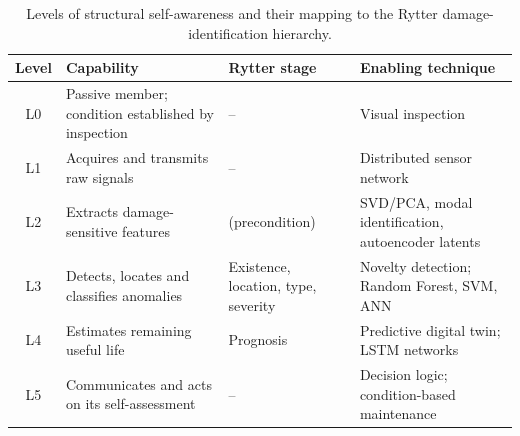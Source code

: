 \begin{table}[htbp]
\centering
\caption{Levels of structural self-awareness and their mapping to the Rytter damage-identification hierarchy.}
\label{tab:levels}
\begin{tabularx}{\linewidth}{@{}c X p{2.5cm} X@{}}
\toprule
\textbf{Level} & \textbf{Capability} & \textbf{Rytter stage} & \textbf{Enabling technique} \\
\midrule
L0 & Passive member; condition established by inspection & --             & Visual inspection \\
L1 & Acquires and transmits raw signals                 & --             & Distributed sensor network \\
L2 & Extracts damage-sensitive features                 & (precondition) & SVD/PCA, modal identification, autoencoder latents \\
L3 & Detects, locates and classifies anomalies          & Existence, location, type, severity & Novelty detection; Random Forest, SVM, ANN \\
L4 & Estimates remaining useful life                    & Prognosis & Predictive digital twin; LSTM networks \\
L5 & Communicates and acts on its self-assessment       & --             & Decision logic; condition-based maintenance \\
\bottomrule
\end{tabularx}
\end{table}
